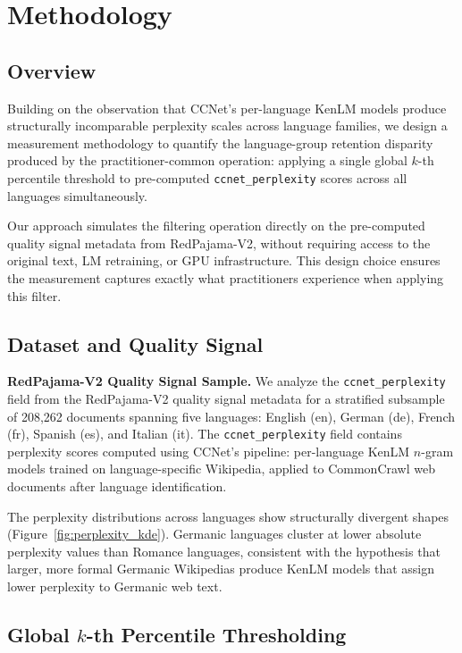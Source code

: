 \section{Methodology}
\label{sec:methodology}

\subsection{Overview}

Building on the observation that CCNet's per-language KenLM models produce structurally incomparable perplexity scales across language families, we design a measurement methodology to quantify the language-group retention disparity produced by the practitioner-common operation: applying a single global $k$-th percentile threshold to pre-computed \texttt{ccnet\_perplexity} scores across all languages simultaneously.

Our approach simulates the filtering operation directly on the pre-computed quality signal metadata from RedPajama-V2, without requiring access to the original text, LM retraining, or GPU infrastructure. This design choice ensures the measurement captures exactly what practitioners experience when applying this filter.

\subsection{Dataset and Quality Signal}

\textbf{RedPajama-V2 Quality Signal Sample.} We analyze the \texttt{ccnet\_perplexity} field from the RedPajama-V2 quality signal metadata for a stratified subsample of 208,262 documents spanning five languages: English (en), German (de), French (fr), Spanish (es), and Italian (it). The \texttt{ccnet\_perplexity} field contains perplexity scores computed using CCNet's pipeline: per-language KenLM $n$-gram models trained on language-specific Wikipedia, applied to CommonCrawl web documents after language identification.

The perplexity distributions across languages show structurally divergent shapes (Figure~\ref{fig:perplexity_kde}). Germanic languages cluster at lower absolute perplexity values than Romance languages, consistent with the hypothesis that larger, more formal Germanic Wikipedias produce KenLM models that assign lower perplexity to Germanic web text.

\subsection{Global \texorpdfstring{$k$}{k}-th Percentile Thresholding}

